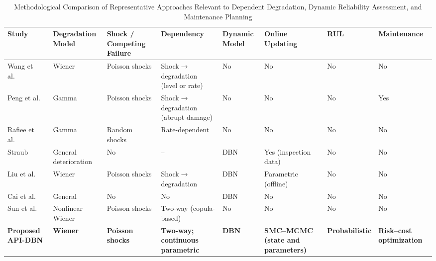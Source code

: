 \documentclass[journal]{IEEEtran}
\begin{document}
\begin{table}[t]
\centering
\caption{Methodological Comparison of Representative Approaches Relevant to
Dependent Degradation, Dynamic Reliability Assessment, and Maintenance Planning}
\label{tab:comparison}

\renewcommand{\arraystretch}{1.15}
\setlength{\tabcolsep}{4pt}
\footnotesize

\begin{tabular}{
p{2.5cm}
p{2.0cm}
p{2.1cm}
p{2.0cm}
p{1.7cm}
p{1.6cm}
p{1.5cm}
p{1.8cm}}
\toprule

\textbf{Study} &
\textbf{Degradation Model} &
\textbf{Shock / Competing Failure} &
\textbf{Dependency} &
\textbf{Dynamic Model} &
\textbf{Online Updating} &
\textbf{RUL} &
\textbf{Maintenance} \\

\midrule


Wang et al.~\cite{wang2011} &
Wiener &
Poisson shocks &
Shock$\to$degradation (level or rate) &
No &
No &
No &
No \\


Peng et al.~\cite{peng2010} &
Gamma &
Poisson shocks &
Shock$\to$degradation (abrupt damage) &
No &
No &
No &
Yes \\

Rafiee et al.~\cite{rafiee2014} &
Gamma &
Random shocks &
Rate-dependent &
No &
No &
No &
No \\


Straub~\cite{straub2009} &
General deterioration &
No &
-- &
DBN &
Yes (inspection data) &
No &
No \\


Liu et al.~\cite{liu2023} &
Wiener &
Poisson shocks &
Shock$\to$degradation &
DBN &
Parametric (offline) &
No &
No \\

Cai et al.~\cite{cai2020resil} &
General &
No &
No &
DBN &
No &
No &
No \\


Sun et al.~\cite{sun2021} &
Nonlinear Wiener &
Poisson shocks &
Two-way (copula-based) &
No &
No &
No &
No \\

\textbf{Proposed API-DBN} &
\textbf{Wiener} &
\textbf{Poisson shocks} &
\textbf{Two-way; continuous parametric} &
\textbf{DBN} &
\textbf{SMC--MCMC (state and parameters)} &
\textbf{Probabilistic} &
\textbf{Risk--cost optimization} \\

\bottomrule
\end{tabular}
\end{table}
\end{document}
